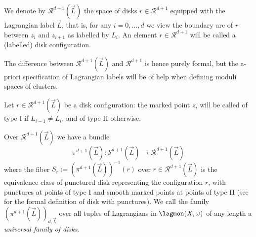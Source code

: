 \begin{dfn}
	We denote by $\mathcal{R}^{d+1}(\vec{L})$ the space of disks $r\in \mathcal{R}^{d+1}$ equipped with the Lagrangian label $\vec{L}$, that is, for any $i=0,\ldots,d$ we view the boundary arc of $r$ between $z_i$ and $z_{i+1}$ as labelled by $L_i$. An element $r\in \mathcal{R}^{d+1}$ will be called a (labelled) disk configuration.
\end{dfn}\noindent The difference between $\mathcal{R}^{d+1}(\vec{L})$ and $\mathcal{R}^{d+1}$ is hence purely formal, but the a-priori specification of Lagrangian labels will be of help when defining moduli spaces of clusters.
\begin{dfn}\label{defoftype}
	Let $r\in \mathcal{R}^{d+1}(\vec{L})$ be a disk configuration: the marked point $z_i$ will be called of type I if $L_{i-1}\neq L_i$, and of type II otherwise.
\end{dfn}
\noindent Over $\mathcal{R}^{d+1}(\vec{L})$ we have a bundle $$\pi^{d+1}(\vec{L}): \mathcal{S}^{d+1}(\vec{L})\to \mathcal{R}^{d+1}(\vec{L})$$ where the fiber $S_r:=\left(\pi^{d+1}(\vec{L})\right)^{-1}(r)$ over $r\in \mathcal{R}^{d+1}(\vec{L})$ is the equivalence class of punctured disk representing the configuration $r$, with punctures at points of type I and smooth marked points at points of type II (see \cite{Se:book-fukaya-categ} for the formal definition of disk with punctures). We call the family $\left(\pi^{d+1}(\vec{L})\right)_{d,\vec{L}}$ over all tuples of Lagrangians in $\lagmon(X,\omega)$ of any length a \textit{universal family of disks}.\\

